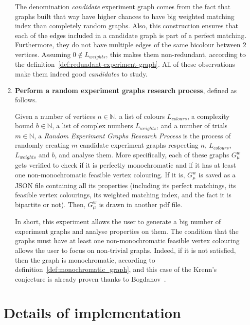 \begin{enumerate}
    The denomination \textit{candidate} experiment graph comes from the fact that graphs built that way have higher chances to have big weighted matching index than completely random graphs.
    Also, this construction ensures that each of the edges included in a candidate graph is part of a perfect matching.
    Furthermore, they do not have multiple edges of the same bicolour between $2$ vertices.
    Assuming $0 \notin L_{weights}$, this makes them non-redundant, according to the definition~\ref{def:redundant-experiment-graph}.
    All of these observations make them indeed good \textit{candidates} to study.

    \item \textbf{Perform a random experiment graphs research process}, defined as follows.
        \begin{definition}
            \label{def:random_experiment_graphs_research_process}
            Given a number of vertices $n \in \mathbb{N}$, a list of colours $L_{colours}$, a complexity bound $b \in \mathbb{N}$, a list of complex numbers $L_{weights}$, and a number of trials $m \in \mathbb{N}$, a \textit{Random Experiment Graphs Research Process} is the process of randomly creating $m$ candidate experiment graphs respecting $n$, $L_{colours}$, $L_{weights}$ and $b$, and analyse them.
            More specifically, each of these graphs $G_\mu^w$ gets verified to check if it is perfectly monochromatic and if it has at least one non-monochromatic feasible vertex colouring.
            If it is, $G_\mu^w$ is saved as a JSON file containing all its properties (including its perfect matchings, its feasible vertex colourings, its weighted matching index, and the fact it is bipartite or not).
            Then, $G_\mu^w$ is drawn in another pdf file.
        \end{definition}

        In short, this experiment allows the user to generate a big number of experiment graphs and analyse properties on them.
        The condition that the graphs must have at least one non-monochromatic feasible vertex colouring allows the user to focus on non-trivial graphs.
        Indeed, if it is not satisfied, then the graph is monochromatic, according to definition~\ref{def:monochromatic_graph}, and this case of the Krenn's conjecture is already proven thanks to Bogdanov~\cite{bogdanov}.

\end{enumerate}


\section{Details of implementation}
\label{sec:details-of-implementation}

